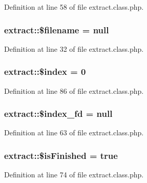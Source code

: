 Definition at line 58 of file extract.\+class.\+php.

\subsubsection[{\texorpdfstring{\$filename}{$filename}}]{\setlength{\rightskip}{0pt plus 5cm}extract\+::\$filename = {\bf null}}\hypertarget{classextract_abec232df6889e57dd327ddf132799f4c}{}\label{classextract_abec232df6889e57dd327ddf132799f4c}


Definition at line 32 of file extract.\+class.\+php.

\subsubsection[{\texorpdfstring{\$index}{$index}}]{\setlength{\rightskip}{0pt plus 5cm}extract\+::\$index = 0}\hypertarget{classextract_a167ca671b16d1b95eef76886f6d91a0c}{}\label{classextract_a167ca671b16d1b95eef76886f6d91a0c}


Definition at line 86 of file extract.\+class.\+php.

\subsubsection[{\texorpdfstring{\$index\+\_\+fd}{$index_fd}}]{\setlength{\rightskip}{0pt plus 5cm}extract\+::\$index\+\_\+fd = {\bf null}}\hypertarget{classextract_a6805ee81f498cae226d90b8fa9ecba88}{}\label{classextract_a6805ee81f498cae226d90b8fa9ecba88}


Definition at line 63 of file extract.\+class.\+php.

\subsubsection[{\texorpdfstring{\$is\+Finished}{$isFinished}}]{\setlength{\rightskip}{0pt plus 5cm}extract\+::\$is\+Finished = true}\hypertarget{classextract_a0962c888279f7c5d551d3fdf1af1ee4c}{}\label{classextract_a0962c888279f7c5d551d3fdf1af1ee4c}


Definition at line 74 of file extract.\+class.\+php.


